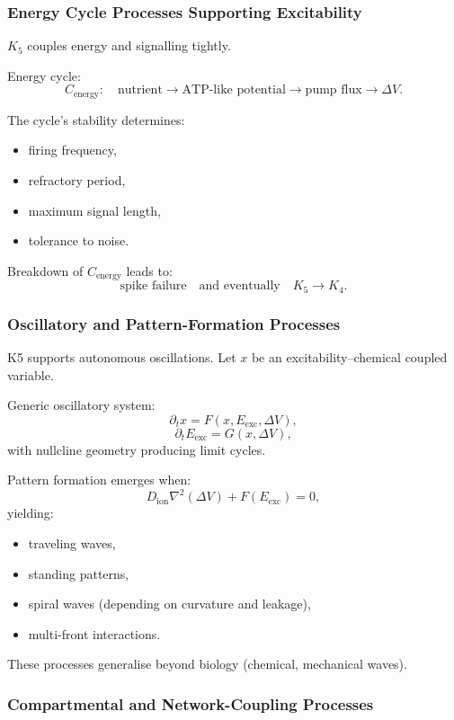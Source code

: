 \subsubsection{Energy Cycle Processes Supporting Excitability}

$K_5$ couples energy and signalling tightly.

Energy cycle:
\[
C_{\text{energy}}:\quad
\text{nutrient} \to \text{ATP-like potential} \to
\text{pump flux} \to \Delta V.
\]

The cycle’s stability determines:
\begin{itemize}
    \item firing frequency,
    \item refractory period,
    \item maximum signal length,
    \item tolerance to noise.
\end{itemize}

Breakdown of $C_{\text{energy}}$ leads to:
\[
\text{spike failure} \quad\text{and eventually}\quad K_5 \to K_4.
\]

\subsubsection{Oscillatory and Pattern-Formation Processes}

K5 supports autonomous oscillations.
Let $x$ be an excitability–chemical coupled variable.

Generic oscillatory system:
\[
\partial_t x = F(x, E_{\text{exc}}, \Delta V),
\]
\[
\partial_t E_{\text{exc}} = G(x, \Delta V),
\]
with nullcline geometry producing limit cycles.

Pattern formation emerges when:
\[
D_{\text{ion}} \nabla^2 (\Delta V) + F(E_{\text{exc}}) = 0,
\]
yielding:
\begin{itemize}
    \item traveling waves,
    \item standing patterns,
    \item spiral waves (depending on curvature and leakage),
    \item multi-front interactions.
\end{itemize}

These processes generalise beyond biology (chemical, mechanical waves).

\subsubsection{Compartmental and Network-Coupling Processes}

